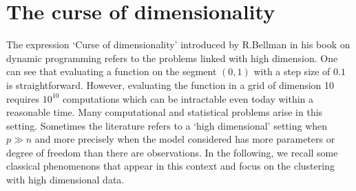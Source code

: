 \section{The curse of dimensionality}
\label{curse_dim_section}
The expression `Curse of dimensionality' introduced by R.Bellman in his book on dynamic programming \citep{Bellman:1957} refers to the problems linked with high dimension. One can see that evaluating a function on the segment $(0,1)$ with a step size of $0.1$ is straightforward. However, evaluating the function in a grid of dimension 10 requires $10^{10}$ computations which can be intractable even today within a reasonable time. Many computational and statistical problems arise in this setting. Sometimes the literature refers to a `high dimensional' setting when $p \gg n$ and more precisely when the model considered has more parameters or degree of freedom than there are observations. In the following, we recall some classical phenomenons that appear in this context and focus on the clustering with high dimensional data. 


